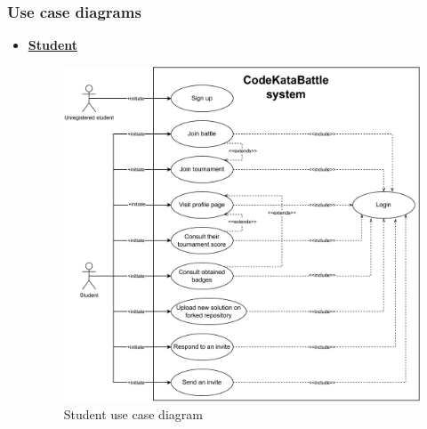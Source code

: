 \documentclass{article}
\begin{document}
{    \subsubsection{Use case diagrams}
            \begin{itemize}
                \item \underline{\large{\textbf{Student}}}
                    \begin{figure}[H]
                        \centering
                        \includegraphics[scale=0.55]{images/3.2.2_UseCaseDiagrams/CaseDiagramStudent.pdf}
                        \caption{Student use case diagram}
                        \label{fig:studentUseCaseDiagram}
                    \end{figure}
                    

\end{itemize}}
\end{document}
